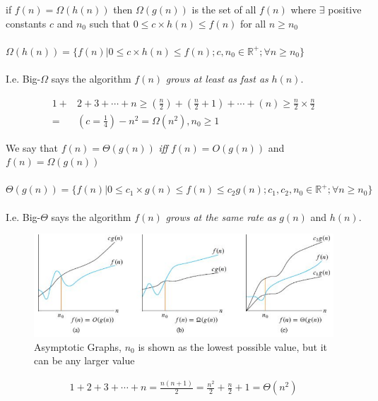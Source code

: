 \begin{theorem}
    if $f(n) = \Omega(h(n))$ then $\Omega(g(n))$ is the set of all $f(n)$ where $\exists$ positive constants $c$ and $n_0$ such that $0 \leq c\times h(n) \leq f(n) $ for all $n \geq n_0$ \\\\
    $\Omega(h(n)) = \{f(n) | 0 \leq c\times h(n) \leq f(n); c, n_0 \in \mathbb{R}^+; \forall n \geq n_0 \}$ \\\\
    I.e. Big-$\Omega$ says the algorithm $f(n)$ \textit{grows at least as fast as} $h(n)$.
\end{theorem}
\begin{example}
    \begin{align*}
        1 + & 2 + 3 + \cdots + n \geq (\frac{n}{2}) + (\frac{n}{2} + 1) + \cdots + (n) \geq \frac{n}{2}\times \frac{n}{2} \\
        =   & (c = \frac{1}{4}) - n^2 = \Omega(n^2), n_0 \geq 1
    \end{align*}
\end{example}

\begin{theorem}
    We say that $f(n) = \Theta(g(n))$ \textit{iff} $f(n) = O(g(n))$ and $f(n) = \Omega(g(n))$ \\\\
    $\Theta(g(n)) = \{f(n) | 0 \leq c_1\times g(n) \leq f(n)\leq c_2 g(n) ; c_1, c_2, n_0 \in \mathbb{R}^+; \forall n \geq n_0 \}$ \\\\
    I.e. Big-$\Theta$ says the algorithm $f(n)$ \textit{grows at the same rate as} $g(n)$ and $h(n)$.
\end{theorem}
\begin{figure}[H]
    \centering
    \includegraphics[scale=0.75]{./LECTURE_1/asymptotic_graphs.png}
    \caption{Asymptotic Graphs, $n_0$ is shown as the lowest possible value, but it can be any larger value}
\end{figure}
\begin{example}
    \begin{align*}
        1 + 2 + 3 + \cdots + n = \frac{n(n+1)}{2} =
        \frac{n^2}{2} + \frac{n}{2} + 1= \Theta(n^2)
    \end{align*}
\end{example}

